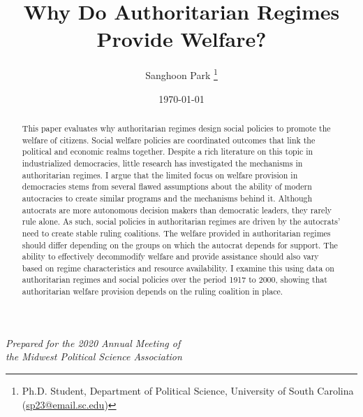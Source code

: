 \documentclass[11pt, notitlepage]{article}
\title{\bf Why Do Authoritarian Regimes Provide Welfare?}
\author{Sanghoon Park
	\thanks{\small \small Ph.D. Student, Department of Political Science, University of South Carolina\\
		 \hspace*{1.8em}(\href{sp23@email.sc.edu}{sp23@email.sc.edu})}}
\date{\today}
\begin{document}
\begin{titlingpage}
	\maketitle
   \begin{center}
	\centering \onehalfspacing \it Prepared for the 2020 Annual Meeting of\\the Midwest Political Science Association
\end{center}

	
\begin{abstract}
\onehalfspacing
\noindent This paper evaluates why authoritarian regimes design social policies to promote the welfare of citizens. Social welfare policies are coordinated outcomes that link the political and economic realms together. Despite a rich literature on this topic in industrialized democracies, little research has investigated the mechanisms in authoritarian regimes. I argue that the limited focus on welfare provision in democracies stems from several flawed assumptions about the ability of modern autocracies to create similar programs and the mechanisms behind it. Although autocrats are more autonomous decision makers than democratic leaders, they rarely rule alone. As such, social policies in authoritarian regimes are driven by the autocrats’ need to create stable ruling coalitions. The welfare provided in authoritarian regimes should differ depending on the groups on which the autocrat depends for support. The ability to effectively decommodify welfare and provide assistance should also vary based on regime characteristics and resource availability. I examine this using data on authoritarian regimes and social policies over the period 1917 to 2000, showing that authoritarian welfare provision depends on the ruling coalition in place.
\end{abstract}
\end{titlingpage}
\end{document}
